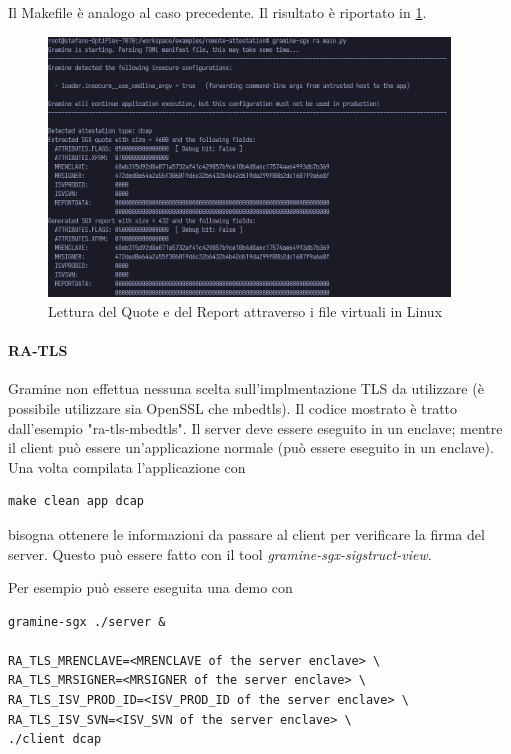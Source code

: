 \documentclass{article}
\begin{document}


Il Makefile è analogo al caso precedente. Il risultato è riportato in \cref{fig:ra-low-level-example}.

\begin{figure}
  \begin{center}
    \includegraphics[width=0.95\textwidth]{figures/ch3/ra-low-level-example.png}
  \end{center}
  \caption{Lettura del Quote e del Report attraverso i file virtuali in Linux}\label{fig:ra-low-level-example}
\end{figure}

\paragraph{RA-TLS}
Gramine non effettua nessuna scelta sull'implmentazione TLS da utilizzare (è possibile utilizzare sia OpenSSL che mbedtls). Il codice mostrato è tratto dall'esempio "ra-tls-mbedtls". Il server deve essere eseguito in un enclave; mentre il client può essere un'applicazione normale (può essere eseguito in un enclave). Una volta compilata l'applicazione con

\begin{verbatim}
make clean app dcap 
\end{verbatim}

bisogna ottenere le informazioni da passare al client per verificare la firma del server. Questo può essere fatto con il tool \textit{gramine-sgx-sigstruct-view}. 

Per esempio può essere eseguita una demo con 
\begin{verbatim}
gramine-sgx ./server &

RA_TLS_MRENCLAVE=<MRENCLAVE of the server enclave> \
RA_TLS_MRSIGNER=<MRSIGNER of the server enclave> \
RA_TLS_ISV_PROD_ID=<ISV_PROD_ID of the server enclave> \
RA_TLS_ISV_SVN=<ISV_SVN of the server enclave> \
./client dcap
\end{verbatim}
\end{document}
